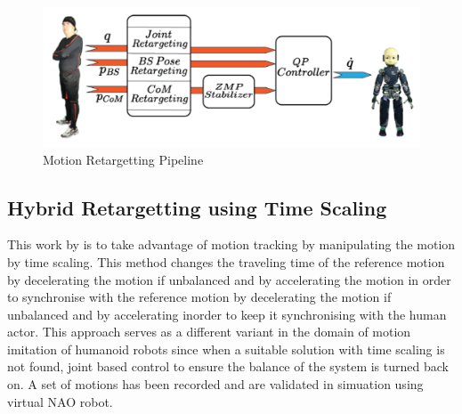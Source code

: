\begin{figure}[h!]
    \centering
    \includegraphics[scale=0.4]{images/gucci-work.png}\hfill
    \caption{Motion Retargetting Pipeline \cite{gucci:hal-01895145}}\hfill
    \label{fig: gucci's work}
\end{figure}

\subsection{Hybrid Retargetting using Time Scaling}

This work by \cite{karthikmunirathinam} is to take advantage of motion tracking by manipulating the motion by time scaling. This method changes
the traveling time of the reference motion by decelerating the motion if unbalanced and by accelerating the motion in order to synchronise with the
reference motion by decelerating the motion if unbalanced and by accelerating inorder to keep it synchronising with the human actor. This approach serves as 
a different variant in the domain of motion imitation of humanoid robots since when a suitable solution with time scaling is not found, joint based control 
to ensure the balance of the system is turned back on. A set of motions has been recorded and are validated in simuation using virtual NAO robot. 
